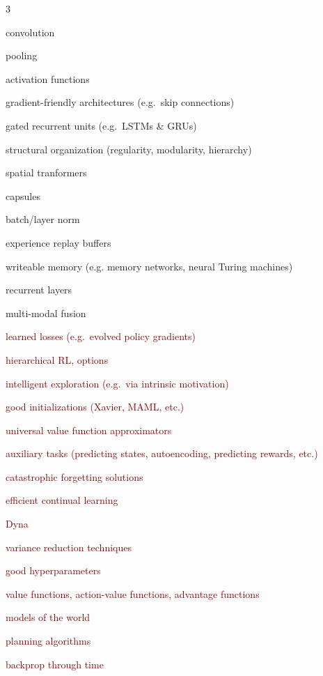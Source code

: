 \documentclass{article}
\begin{document}
\begin{table}
\label{tableOfBBs}
   \begin{multicols}{3}
    \begin{itemize}
    \item convolution
    \item pooling
\item activation functions
\item gradient-friendly architectures (e.g.\ skip connections)
\item gated recurrent units (e.g.\ LSTMs \& GRUs)
\item structural organization (regularity, modularity, hierarchy) 
\item spatial tranformers
\item capsules
\item batch/layer norm
\item experience replay buffers
\item writeable memory (e.g. memory networks, neural Turing machines)
\item recurrent layers
\item multi-modal fusion
\textcolor{maroon}
{
\item [$\diamond$] learned losses (e.g.\ evolved policy gradients)
\item [$\diamond$] hierarchical RL, options
\item [$\diamond$] intelligent exploration (e.g.\ via intrinsic motivation)
\item [$\diamond$] good initializations (Xavier, MAML, etc.)
\item [$\diamond$] universal value function approximators
\item [$\diamond$] auxiliary tasks (predicting states, autoencoding, predicting rewards, etc.) 
\item [$\diamond$] catastrophic forgetting solutions 
\item [$\diamond$] efficient continual learning 
\item [$\diamond$] Dyna
\item [$\diamond$] variance reduction techniques 
\item [$\diamond$] good hyperparameters 
\item [$\diamond$] value functions, action-value functions, advantage functions
\item [$\diamond$] models of the world
\item [$\diamond$] planning algorithms
\item [$\diamond$] backprop through time
}
\end{itemize}
\end{multicols}
\end{table}
\end{document}
